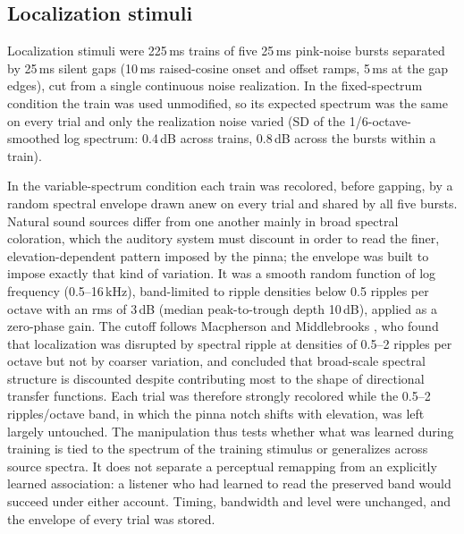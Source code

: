 
\subsection{Localization stimuli}

Localization stimuli were 225\,ms trains of five 25\,ms pink-noise bursts
separated by 25\,ms silent gaps (10\,ms raised-cosine onset and offset ramps,
5\,ms at the gap edges), cut from a single continuous noise realization. In the
fixed-spectrum condition the train was used unmodified, so its expected
spectrum was the same on every trial and only the realization noise varied
(SD of the 1/6-octave-smoothed log spectrum: 0.4\,dB across trains, 0.8\,dB
across the bursts within a train).

In the variable-spectrum condition each train was recolored, before gapping, by
a random spectral envelope drawn anew on every trial and shared by all five
bursts. Natural sound sources differ from one another mainly in broad spectral
coloration, which the auditory system must discount in order to read the finer,
elevation-dependent pattern imposed by the pinna; the envelope was built to
impose exactly that kind of variation. It was a smooth random function of log
frequency (0.5--16\,kHz), band-limited to ripple densities below 0.5 ripples
per octave with an rms of 3\,dB (median peak-to-trough depth 10\,dB), applied as
a zero-phase gain. The cutoff follows Macpherson and Middlebrooks
, who found that localization was disrupted by spectral ripple at densities of
0.5--2 ripples per octave but not by coarser variation, and concluded that
broad-scale spectral structure is discounted despite contributing most to the
shape of directional transfer functions. Each trial was
therefore strongly recolored while the 0.5--2 ripples/octave band, in which the
pinna notch shifts with elevation, was left largely untouched. The manipulation
thus tests whether what was learned during training is tied to the spectrum of
the training stimulus or generalizes across source spectra. It does not
separate a perceptual remapping from an explicitly learned association: a
listener who had learned to read the preserved band would succeed under either
account. Timing, bandwidth and level were unchanged, and the envelope of every
trial was stored.

